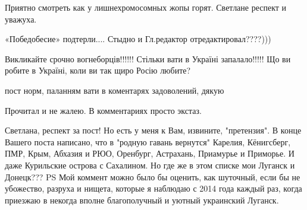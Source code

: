 \begin{itemize}
 
Приятно смотреть как у лишнехромосомных жопы горят. Светлане респект и уважуха.

 
«Победобесие» подтерли.... Стыдно и Гл.редактор отредактировал????)))

 
Викликайте срочно вогнеборців!!!!!! Стільки вати в Україні запалало!!!!! Що ви робите в Україні, коли ви так щиро Росію любите?

 
пост норм, паланням вати в коментарях задоволений, дякую

 
Прочитал и не жалею. В комментариях просто экстаз.

 

Светлана, респект за пост! Но есть у меня к Вам, извините, "претензия". В конце
Вашего поста написано, что в "родную гавань вернутся" Карелия, Кёнигсберг, ПМР,
Крым, Абхазия и РЮО, Оренбург, Астрахань, Приамурье и Приморье. И даже
Курильские острова с Сахалином. Но где же в этом списке мои Луганск и Донецк???
PS Мой коммент можно было бы оценить, как шуточный, если бы не убожество,
разруха и нищета, которые я наблюдаю с 2014 года каждый раз, когда приезжаю в
некогда вполне благополучный и уютный украинский Луганск.



\end{itemize}
